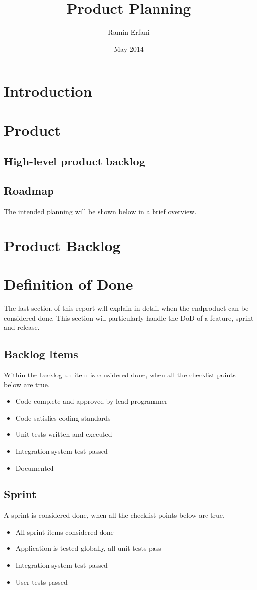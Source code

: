 \documentclass{article}
\title{Product Planning}
\author{Ramin Erfani}
\date{May 2014}
\begin{document}
\maketitle

\section{Introduction}
\section{Product}
\subsection{High-level product backlog}
\subsection{Roadmap}
The intended planning will be shown below in a brief overview.
\section{Product Backlog}
\section{Definition of Done}
The last section of this report will explain in detail when the endproduct can be considered done. This section will particularly handle the DoD of a feature, sprint and release.
\subsection{Backlog Items}
Within the backlog an item is considered done, when all the checklist points below are true.
\begin{itemize}
	\item Code complete and approved by lead programmer
	\item Code satisfies coding standards
	\item Unit tests written and executed
	\item Integration system test passed
	\item Documented
\end{itemize}
\subsection{Sprint}
A sprint is considered done, when all the checklist points below are true.
\begin{itemize}
	\item All sprint items considered done
	\item Application is tested globally, all unit tests pass
	\item Integration system test passed
	\item User tests passed
\end{itemize}
\end{document}
